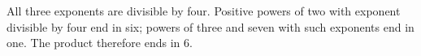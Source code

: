 All three exponents are divisible by four. Positive powers of two with exponent divisible by four end in six; powers of three and seven with such exponents end in one. The product therefore ends in $\boxed6$.
